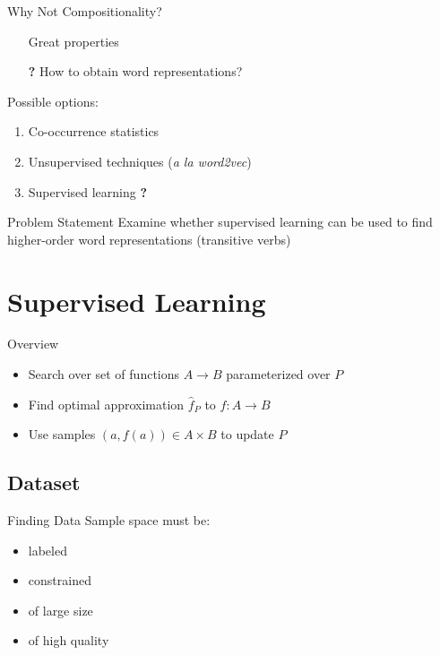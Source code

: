 \documentclass{beamer}
\newcommand{\xmark}{\ding{55}}
\begin{document}
\begin{frame}{Why Not Compositionality?}
	\begin{itemize}
	\item[\textcolor{Yes}{\checkmark}] Great properties
	\item[\textcolor{Maybe}{\textbf{?}}] How to obtain word representations?
	\end{itemize}
	
	
	Possible options:
	\begin{enumerate}
	\pause
	\item Co-occurrence statistics 
	\pause \textcolor{No}{\xmark}
	\item Unsupervised techniques (\textit{a la word2vec})
	\pause \textcolor{No}{\xmark}
	\item Supervised learning \textcolor{Maybe}{\textbf{?}}
	\end{enumerate}
\end{frame}

\begin{frame}{Problem Statement}
\centering
Examine whether supervised learning can be used to find higher-order word representations (transitive verbs)
\end{frame}
	
\section{Supervised Learning}

\begin{frame}{Overview}
	\begin{itemize}
	\item Search over set of functions $A \to B$ parameterized over $P$
	\item Find optimal approximation $\hat{f}_P$ to $f: A \to B$
	\item Use samples $(a, f(a)) \in A\times B$ to update $P$
	\end{itemize}	
\end{frame}

\subsection{Dataset} 

\begin{frame}{Finding Data}
	Sample space must be:
	\begin{itemize}
	\item labeled
	\item constrained
	\item of large size
	\item of high quality
	\end{itemize}
\end{frame}
\end{document}
